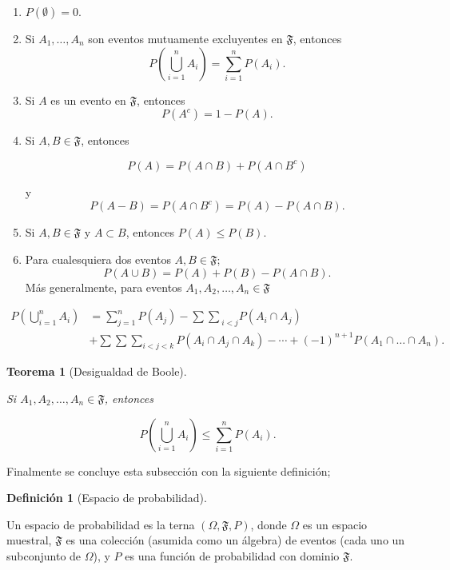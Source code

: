 \documentclass[
  us-letterpaper,
]{scrreprt}
\theoremstyle{plain}
\theoremstyle{definition}
\newtheorem{definition}{Definición}[chapter]
\theoremstyle{definition}
\theoremstyle{plain}
\newtheorem{theorem}{Teorema}[chapter]
\theoremstyle{remark}
\begin{document}
\begin{enumerate}
\def\labelenumi{\roman{enumi}.}
\item
  \(P(\emptyset)=0\).
\item
  Si \(A_1, \ldots, A_n\) son eventos mutuamente excluyentes en
  \(\mathfrak{F}\), entonces
  \[P\left(\bigcup\limits_{i=1}^n A_i\right)= \sum\limits_{i=1}^n P(A_i).\]
\item
  Si \(A\) es un evento en \(\mathfrak{F}\), entonces
  \[P(A^c)= 1-P(A).\]
\item
  Si \(A,B\in\mathfrak{F}\), entonces

  \[P(A)= P(A\cap B)+ P(A\cap B^c)\]

  y \[P(A-B)=P(A\cap B^c)= P(A)-P(A\cap B).\]
\item
  Si \(A,B\in \mathfrak{F}\) y \(A\subset B\), entonces
  \(P(A)\leq P(B)\).
\item
  Para cualesquiera dos eventos \(A,B\in \mathfrak{F}\);
  \[P(A\cup B)= P(A)+P(B)-P(A\cap B).\]Más generalmente, para eventos
  \(A_1, A_2, \ldots, A_n\in \mathfrak{F}\)
\end{enumerate}

\[ \begin{split}P\left(\bigcup\limits_{i=1}^n A_i\right) & = \sum_{j=1}^nP(A_j)-{\sum\sum}_{i<j} P(A_i\cap A_j)\\ &+\sum\sum\sum_{i<j<k}P(A_i\cap A_j\cap A_k) -\cdots+(-1)^{n+1}P(A_1\cap \ldots\cap A_n).\end{split} \]

\begin{theorem}[Desigualdad de
Boole]\protect\hypertarget{thm-boole}{}\label{thm-boole}

Si \(A_1, A_2, \ldots, A_n\in\mathfrak{F}\), entonces

\[P\left(\bigcup_{i=1}^n A_i\right)\leq \sum_{i=1}^n P(A_i).\]

\end{theorem}

Finalmente se concluye esta subsección con la siguiente definición;

\begin{definition}[Espacio de
probabilidad]\protect\hypertarget{def-Ep}{}\label{def-Ep}

Un espacio de probabilidad es la terna \((\Omega, \mathfrak{F}, P)\),
donde \(\Omega\) es un espacio muestral, \(\mathfrak{F}\) es una
colección (asumida como un álgebra) de eventos (cada uno un subconjunto
de \(\Omega\)), y \(P\) es una función de probabilidad con dominio
\(\mathfrak{F}\).

\end{definition}
\end{document}
